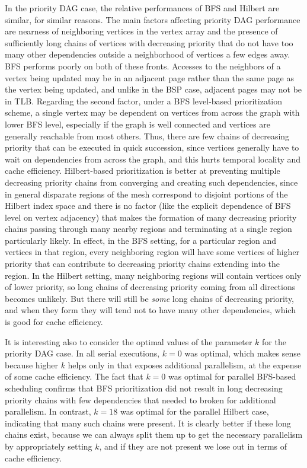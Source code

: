 \documentclass[journal]{IEEEtran}
\begin{document}
In the priority DAG case, the relative performances of BFS and Hilbert are similar, for similar reasons. The main factors affecting priority DAG performance are nearness of neighboring vertices in the vertex array and the presence of sufficiently long chains of vertices with decreasing priority that do not have too many other dependencies outside a neighborhood of vertices a few edges away. BFS performs poorly on both of these fronts. Accesses to the neighbors of a vertex being updated may be in an adjacent page rather than the same page as the vertex being updated, and unlike in the BSP case, adjacent pages may not be in TLB. Regarding the second factor, under a BFS level-based prioritization scheme, a single vertex may be dependent on vertices from across the graph with lower BFS level, especially if the graph is well connected and vertices are generally reachable from most others. Thus, there are few chains of decreasing priority that can be executed in quick succession, since vertices generally have to wait on dependencies from across the graph, and this hurts temporal locality and cache efficiency. Hilbert-based prioritization is better at preventing multiple decreasing priority chains from converging and creating such dependencies, since in general disparate regions of the mesh correspond to disjoint portions of the Hilbert index space and there is no factor (like the explicit dependence of BFS level on vertex adjacency) that makes the formation of many decreasing priority chains passing through many nearby regions and terminating at a single region particularly likely. In effect, in the BFS setting, for a particular region and vertices in that region, every neighboring region will have some vertices of higher priority that can contribute to decreasing priority chains extending into the region. In the Hilbert setting, many neighboring regions will contain vertices only of lower priority, so long chains of decreasing priority coming from all directions becomes unlikely. But there will still be \textit{some} long chains of decreasing priority, and when they form they will tend not to have many other dependencies, which is good for cache efficiency.

It is interesting also to consider the optimal values of the parameter $k$ for the priority DAG case. In all serial executions, $k = 0$ was optimal, which makes sense because higher $k$ helps only in that exposes additional parallelism, at the expense of some cache efficiency. The fact that $k = 0$ was optimal for parallel BFS-based scheduling confirms that BFS prioritization did not result in long decreasing priority chains with few dependencies that needed to broken for additional parallelism. In contrast, $k = 18$ was optimal for the parallel Hilbert case, indicating that many such chains were present. It is clearly better if these long chains exist, because we can always split them up to get the necessary parallelism by appropriately setting $k$, and if they are not present we lose out in terms of cache efficiency.
\end{document}
